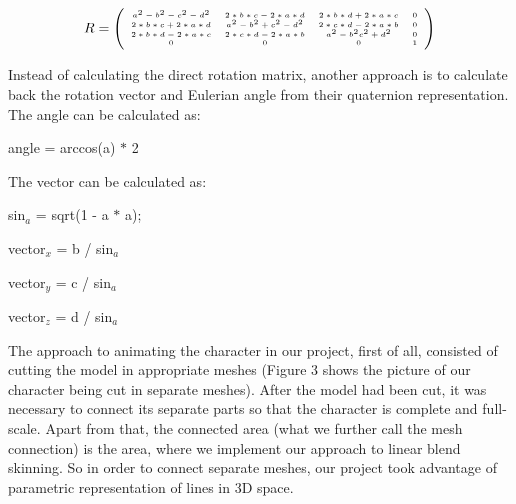\documentclass[times, 10pt,twocolumn]{article}
\begin{document}
\[ R = \left( \begin{tiny}\begin{array}{cccc}
a^{2}-b^{2}-c^{2}-d^{2} & 2 \ast b \ast c-2 \ast a \ast d & 2 \ast b \ast d+2 \ast a \ast c & 0 \\
2 \ast b \ast c+2 \ast a \ast d & a^{2}-b^{2}+c^{2}-d^{2} & 2 \ast c \ast d-2 \ast a \ast b & 0 \\
2 \ast b \ast d-2 \ast a \ast c & 2 \ast c \ast d-2 \ast a \ast b & a^{2}-b^{2}c^{2}+d^{2} & 0 \\
0 & 0 & 0 & 1
\end{array}\end{tiny} \right)\]

Instead of calculating the direct rotation matrix, another approach is to calculate back the rotation vector and Eulerian angle from their quaternion representation. The angle can be calculated as:
\begin{description}
	\item angle = arccos(a) $\ast$ 2
\end{description}

The vector can be calculated as:

\begin{description}
    \setlength{\itemsep}{0pt}

    \item sin$_a$ = sqrt(1 - a $\ast$ a);

	\item vector$_x$ = b / sin$_a$
	\item vector$_y$ = c / sin$_a$
	\item vector$_z$ = d / sin$_a$
\end{description}


\label{line_in_space_section}

The approach to animating the character in our project, first of all, consisted of cutting the model in appropriate meshes (Figure 3 shows the picture of our character being cut in separate meshes).  After the model had been cut, it was necessary to connect its separate parts so that the character is complete and full-scale. Apart from that, the connected area (what we further call the mesh connection) is the area, where we implement our approach to linear blend skinning. So in order to connect separate meshes, our project took advantage of parametric representation of lines in 3D space.
\end{document}
